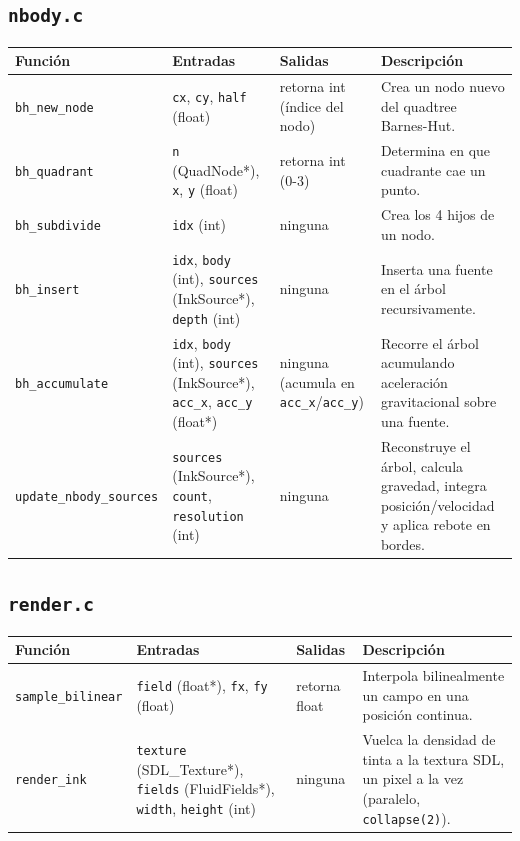 \documentclass[11pt]{article}
\begin{document}
\subsection*{\texttt{nbody.c}}
\begin{longtable}{L{4cm}L{4.1cm}L{2.2cm}L{3.7cm}}
\toprule
Función & Entradas & Salidas & Descripción \\
\midrule
\texttt{bh\_new\_node} & \texttt{cx}, \texttt{cy}, \texttt{half} (float) & retorna int (índice del nodo) & Crea un nodo nuevo del quadtree Barnes-Hut. \\
\texttt{bh\_quadrant} & \texttt{n} (QuadNode*), \texttt{x}, \texttt{y} (float) & retorna int (0-3) & Determina en que cuadrante cae un punto. \\
\texttt{bh\_subdivide} & \texttt{idx} (int) & ninguna & Crea los 4 hijos de un nodo. \\
\texttt{bh\_insert} & \texttt{idx}, \texttt{body} (int), \texttt{sources} (InkSource*), \texttt{depth} (int) & ninguna & Inserta una fuente en el árbol recursivamente. \\
\texttt{bh\_accumulate} & \texttt{idx}, \texttt{body} (int), \texttt{sources} (InkSource*), \texttt{acc\_x}, \texttt{acc\_y} (float*) & ninguna (acumula en \texttt{acc\_x}\allowbreak/\texttt{acc\_y}) & Recorre el árbol acumulando aceleración gravitacional sobre una fuente. \\
\texttt{update\_nbody\_sources} & \texttt{sources} (InkSource*), \texttt{count}, \texttt{resolution} (int) & ninguna & Reconstruye el árbol, calcula gravedad, integra posición/velocidad y aplica rebote en bordes. \\
\bottomrule
\end{longtable}

\subsection*{\texttt{render.c}}
\begin{longtable}{L{4cm}L{4.1cm}L{2.2cm}L{3.7cm}}
\toprule
Función & Entradas & Salidas & Descripción \\
\midrule
\texttt{sample\_bilinear} & \texttt{field} (float*), \texttt{fx}, \texttt{fy} (float) & retorna float & Interpola bilinealmente un campo en una posición continua. \\
\texttt{render\_ink} & \texttt{texture} (SDL\_Texture*), \texttt{fields} (FluidFields*), \texttt{width}, \texttt{height} (int) & ninguna & Vuelca la densidad de tinta a la textura SDL, un pixel a la vez (paralelo, \texttt{collapse(2)}). \\
\bottomrule
\end{longtable}
\end{document}
